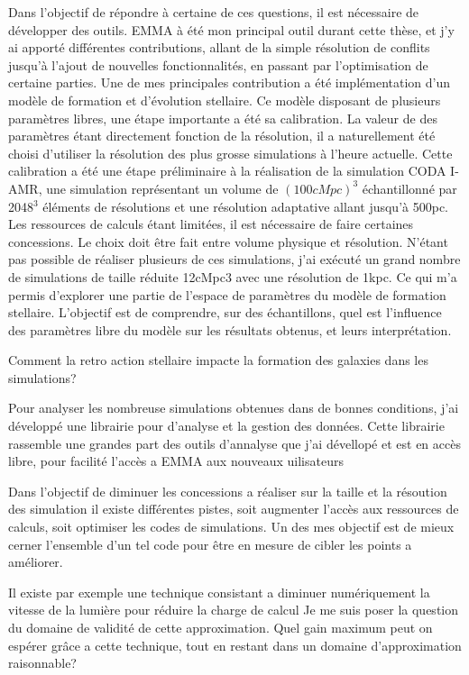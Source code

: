 Dans l'objectif de répondre à certaine de ces questions, il est nécessaire de développer des outils.
EMMA à été mon principal outil durant cette thèse, et j'y ai apporté différentes contributions, allant de la simple résolution de conflits jusqu'à l'ajout de nouvelles fonctionnalités, en passant par l'optimisation de certaine parties.
Une de mes principales contribution a été implémentation d'un modèle de formation et d'évolution stellaire.
Ce modèle disposant de plusieurs paramètres libres, une étape importante a été sa calibration.
La valeur de des paramètres étant directement fonction de la résolution, il a naturellement été choisi d'utiliser la résolution des plus grosse simulations à l'heure actuelle.
Cette calibration a été une étape préliminaire à la réalisation de la simulation CODA I-AMR, une simulation représentant un volume de $(100 cMpc)^3$ échantillonné par 2048$^3$ éléments de résolutions et une résolution adaptative allant jusqu'à 500pc.
Les ressources de calculs étant limitées, il est nécessaire de faire certaines concessions.
Le choix doit être fait entre volume physique et résolution.
N'étant pas possible de réaliser plusieurs de ces simulations, j'ai exécuté un grand nombre de simulations de taille réduite 12cMpc3 avec une résolution de 1kpc. 
Ce qui m'a permis d'explorer une partie de l'espace de paramètres du modèle de formation stellaire.
L'objectif est de comprendre, sur des échantillons, quel est l'influence des paramètres libre du modèle sur les résultats obtenus, et leurs interprétation.

Comment la retro action stellaire impacte la formation des galaxies dans les simulations?

Pour analyser les nombreuse simulations obtenues dans de bonnes conditions, j'ai développé une librairie pour d'analyse et la gestion des données.
Cette librairie rassemble une grandes part des outils d'annalyse que j'ai dévellopé et est en accès libre, pour facilité l'accès a EMMA aux nouveaux uilisateurs


Dans l'objectif de diminuer les concessions a réaliser sur la taille et la résoution des simulation
il existe différentes pistes, soit augmenter l'accès aux ressources de calculs, soit optimiser les codes de simulations.
Un des mes objectif est de mieux cerner l'ensemble d'un tel code pour être en mesure de cibler les points a améliorer.

Il existe par exemple une technique consistant a diminuer numériquement  la vitesse de la lumière pour réduire la charge de calcul
Je me suis poser la question du domaine de validité de cette approximation.
Quel gain maximum peut on espérer grâce a cette technique, tout en restant dans un domaine d'approximation raisonnable?


